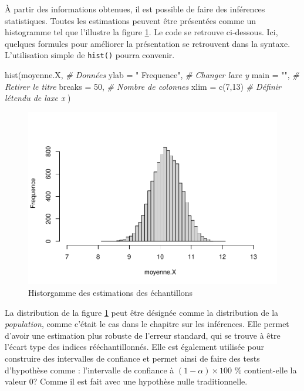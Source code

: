 \documentclass[
]{book}
\newenvironment{Shaded}{}{}
\newcommand{\AttributeTok}[1]{#1}
\newcommand{\CommentTok}[1]{\textit{#1}}
\newcommand{\DecValTok}[1]{#1}
\newcommand{\FunctionTok}[1]{#1}
\newcommand{\NormalTok}[1]{#1}
\newcommand{\StringTok}[1]{#1}
\begin{document}
À partir des informations obtenues, il est possible de faire des inférences statistiques. Toutes les estimations peuvent être présentées comme un histogramme tel que l'illustre la figure \ref{fig:hist2}. Le code se retrouve ci-dessous. Ici, quelques formules pour améliorer la présentation se retrouvent dans la syntaxe. L'utilisation simple de \texttt{hist()} pourra convenir.

\begin{Shaded}
\begin{Highlighting}[]
\FunctionTok{hist}\NormalTok{(moyenne.X,              }\CommentTok{\# Données}
     \AttributeTok{ylab =} \StringTok{" Frequence"}\NormalTok{,    }\CommentTok{\# Changer l\textquotesingle{}axe y}
     \AttributeTok{main =} \StringTok{""}\NormalTok{,              }\CommentTok{\# Retirer le titre}
     \AttributeTok{breaks =} \DecValTok{50}\NormalTok{,            }\CommentTok{\# Nombre de colonnes}
     \AttributeTok{xlim =} \FunctionTok{c}\NormalTok{(}\DecValTok{7}\NormalTok{,}\DecValTok{13}\NormalTok{)          }\CommentTok{\# Définir l\textquotesingle{}étendu de l\textquotesingle{}axe x}
\NormalTok{)}
\end{Highlighting}
\end{Shaded}

\begin{figure}
\centering
\includegraphics{10-Simuler_files/figure-latex/hist2-1.pdf}
\caption{\label{fig:hist2}Historgamme des estimations des échantillons}
\end{figure}

La distribution de la figure \ref{fig:hist2} peut être désignée comme la distribution de la \emph{population}, comme c'était le cas dans le chapitre sur les inférences. Elle permet d'avoir une estimation plus robuste de l'erreur standard, qui se trouve à être l'écart type des indices rééchantillonnés. Elle est également utilisée pour construire des intervalles de confiance et permet ainsi de faire des tests d'hypothèse comme : l'intervalle de confiance à \((1-\alpha) \times 100\) \% contient-elle la valeur 0? Comme il est fait avec une hypothèse nulle traditionnelle.
\end{document}
